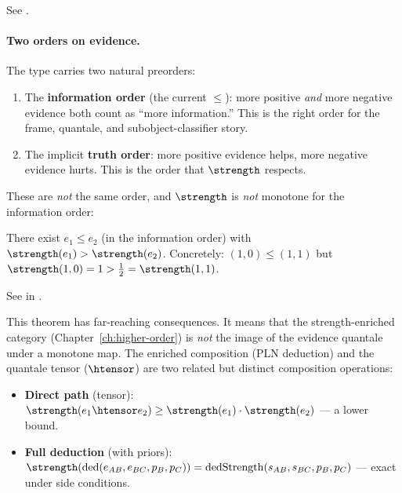 \documentclass[11pt,openany]{report}
\begin{document}
See .

\paragraph{Two orders on evidence.}
The \Evidence{} type carries two natural preorders:
\begin{enumerate}
\item The \textbf{information order} (the current $\le$): more positive
  \emph{and} more negative evidence both count as ``more information.''
  This is the right order for the frame, quantale, and
  subobject-classifier story.
\item The implicit \textbf{truth order}: more positive evidence helps,
  more negative evidence hurts.  This is the order that $\strength$
  respects.
\end{enumerate}

\noindent
These are \emph{not} the same order, and $\strength$ is \emph{not}
monotone for the information order:

\begin{theorem}
\label{thm:strength-not-monotone}
There exist $e_1 \le e_2$ (in the information order) with
$\strength(e_1) > \strength(e_2)$.  Concretely:
$(1, 0) \le (1, 1)$ but $\strength(1, 0) = 1 > \tfrac{1}{2} =
\strength(1, 1)$.
\end{theorem}

\noindent
See  in
.

This theorem has far-reaching consequences.  It means that the
strength-enriched category (Chapter~\ref{ch:higher-order}) is
\emph{not} the image of the evidence quantale under a monotone map.
The enriched composition (PLN deduction) and the quantale tensor
($\htensor$) are two related but distinct composition operations:
\begin{itemize}
\item \textbf{Direct path} (tensor): $\strength(e_1 \htensor e_2)
  \ge \strength(e_1) \cdot \strength(e_2)$ --- a lower bound.
\item \textbf{Full deduction} (with priors): $\strength(\mathrm{ded}(e_{AB},
  e_{BC}, p_B, p_C)) = \mathrm{dedStrength}(s_{AB}, s_{BC}, p_B, p_C)$
  --- exact under side conditions.
\end{itemize}
\end{document}
